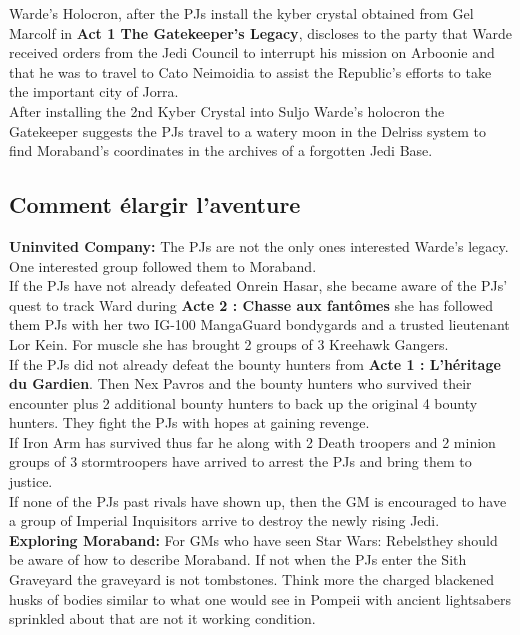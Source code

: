 \documentclass[twoside]{article}
\begin{document}
Warde's Holocron, after the PJs install the kyber crystal obtained from Gel Marcolf in \textbf{Act 1 The Gatekeeper's Legacy}, discloses to the party that Warde received orders from the Jedi Council to interrupt his mission on Arboonie and that he was to travel to Cato Neimoidia to assist the Republic's efforts to take the important city of Jorra.\\

After installing the 2nd Kyber Crystal into Suljo Warde's holocron the Gatekeeper suggests the PJs travel to a watery moon in the Delriss system to find Moraband's coordinates in the archives of a forgotten Jedi Base.\\

\subsection{Comment élargir l'aventure}
\textbf{Uninvited Company:} The PJs are not the only ones interested Warde's legacy.  One interested group followed them to Moraband.\\

If the PJs have not already defeated Onrein Hasar, she became aware of the PJs' quest to track Ward during \textbf{Acte 2 : Chasse aux fantômes} she has followed them PJs with her two IG-100 MangaGuard bondygards and a trusted lieutenant Lor Kein.  For muscle she has brought  2 groups of 3 Kreehawk Gangers.\\

If the PJs did not already defeat the bounty hunters from \textbf{Acte 1 : L'héritage du Gardien}.  Then Nex Pavros and the bounty hunters who survived their encounter plus 2 additional bounty hunters to back up the original 4 bounty hunters.  They fight the PJs with hopes at gaining revenge.\\

If Iron Arm has survived thus far he along with 2 Death troopers and 2 minion groups of 3 stormtroopers have arrived to arrest the PJs and bring them to justice.\\

If none of the PJs past rivals have shown up, then the GM is encouraged to have a group of Imperial Inquisitors arrive to destroy the newly rising Jedi.\\

\textbf{Exploring Moraband:} For GMs who have seen Star Wars: Rebels\texttrademark they should be aware of how to describe Moraband.  If not when the PJs enter the Sith Graveyard the graveyard is not tombstones.  Think more the charged blackened husks of bodies similar to what one would see in Pompeii with ancient lightsabers sprinkled about that are not it working condition.\\
\end{document}
